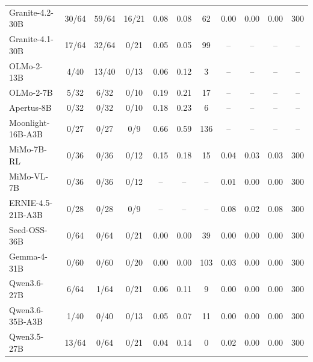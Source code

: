 \begin{table}[htbp]
\begin{tabular}{lcccccccccc}
Granite-4.2-30B & 30/64 & 59/64 & 16/21 & 0.08 & 0.08 & 62 & 0.00 & 0.00 & 0.00 & 300 \\
Granite-4.1-30B & 17/64 & 32/64 & 0/21 & 0.05 & 0.05 & 99 & -- & -- & -- & -- \\
OLMo-2-13B & 4/40 & 13/40 & 0/13 & 0.06 & 0.12 & 3 & -- & -- & -- & -- \\
OLMo-2-7B & 5/32 & 6/32 & 0/10 & 0.19 & 0.21 & 17 & -- & -- & -- & -- \\
Apertus-8B & 0/32 & 0/32 & 0/10 & 0.18 & 0.23 & 6 & -- & -- & -- & -- \\
Moonlight-16B-A3B & 0/27 & 0/27 & 0/9 & 0.66 & 0.59 & 136 & -- & -- & -- & -- \\
MiMo-7B-RL & 0/36 & 0/36 & 0/12 & 0.15 & 0.18 & 15 & 0.04 & 0.03 & 0.03 & 300 \\
MiMo-VL-7B & 0/36 & 0/36 & 0/12 & -- & -- & -- & 0.01 & 0.00 & 0.00 & 300 \\
ERNIE-4.5-21B-A3B & 0/28 & 0/28 & 0/9 & -- & -- & -- & 0.08 & 0.02 & 0.08 & 300 \\
Seed-OSS-36B & 0/64 & 0/64 & 0/21 & 0.00 & 0.00 & 39 & 0.00 & 0.00 & 0.00 & 300 \\
Gemma-4-31B & 0/60 & 0/60 & 0/20 & 0.00 & 0.00 & 103 & 0.03 & 0.00 & 0.00 & 300 \\
Qwen3.6-27B & 6/64 & 1/64 & 0/21 & 0.06 & 0.11 & 9 & 0.00 & 0.00 & 0.00 & 300 \\
Qwen3.6-35B-A3B & 1/40 & 0/40 & 0/13 & 0.05 & 0.07 & 11 & 0.00 & 0.00 & 0.00 & 300 \\
Qwen3.5-27B & 13/64 & 0/64 & 0/21 & 0.04 & 0.14 & 0 & 0.02 & 0.00 & 0.00 & 300 \\
\bottomrule
\end{tabular}
\end{table}
